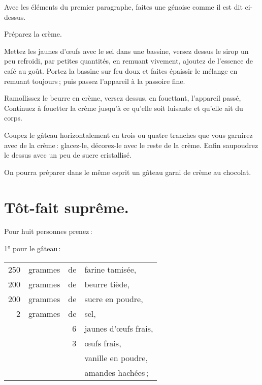 Avec les éléments du premier paragraphe, faites une génoise comme il est dit
ci-dessus.

Préparez la crème.

Mettez les jaunes d'œufs avec le sel dans une bassine, versez dessus le sirop
un peu refroidi, par petites quantités, en remuant vivement, ajoutez de
l'essence de café au goût. Portez la bassine sur feu doux et faites épaissir le
mélange en remuant toujours ; puis passez l'appareil à la passoire fine.

Ramollissez le beurre en crème, versez dessus, en fouettant, l'appareil passé,
Continuez à fouetter la crème jusqu'à ce qu'elle soit luisante et qu'elle ait
du corps.

Coupez le gâteau horizontalement en trois ou quatre tranches que vous garnirez
avec de la crème : glacez-le, décorez-le avec le reste de la crème. Enfin
saupoudrez le dessus avec un peu de sucre cristallisé.

\sk

On pourra préparer dans le même esprit un gâteau garni de crème au chocolat.

\section*{\centering Tôt-fait suprême.}
{}

Pour huit personnes prenez :

\medskip

1° pour le gâteau :

\footnotesize
\begin{longtable}{rrrp{16em}}
    250 & grammes & de & farine tamisée,                                                                  \\
    200 & grammes & de & beurre tiède,                                                                    \\
    200 & grammes & de & sucre en poudre,                                                                 \\
      2 & grammes & de & sel,                                                                             \\
        &         &  6 & jaunes d'œufs frais,                                                             \\
        &         &  3 & œufs frais,                                                                      \\
        &         &    & vanille en poudre,                                                               \\
        &         &    & amandes hachées ;                                                                \\
\end{longtable}
\normalsize

